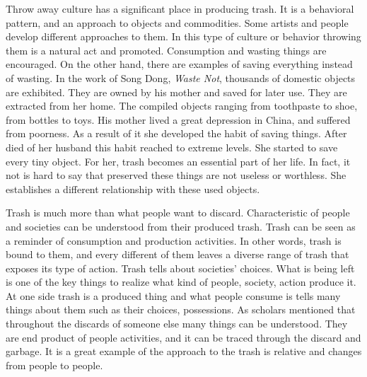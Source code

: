 Throw away culture has a significant place in producing trash. It is a behavioral pattern, and an approach to objects and commodities. Some artists and people develop different approaches to them. In this type of culture or behavior throwing them is a natural act and promoted. Consumption and wasting things are encouraged. On the other hand, there are examples of saving everything instead of wasting. In the work of Song Dong, \textit{Waste Not}, thousands of domestic objects are exhibited. They are owned by his mother and saved for later use. They are extracted from her home. The compiled objects ranging from toothpaste to shoe, from bottles to toys. His mother lived a great depression in China, and suffered from poorness. As a result of it she developed the habit of saving things. After died of her husband this habit reached to extreme levels. She started to save every tiny object. For her, trash becomes an essential part of her life. In fact, it not is hard to say that preserved these things are not useless or worthless. She establishes a different relationship with these used objects.

Trash is much more than what people want to discard. Characteristic of people and societies can be understood from their produced trash. Trash can be seen as a reminder of consumption and production activities. In other words, trash is bound to them, and every different of them leaves a diverse range of trash that exposes its type of action. Trash tells about societies’ choices. What is being left is one of the key things to realize what kind of people, society, action produce it. At one side trash is a produced thing and what people consume is tells many things about them such as their choices, possessions. As scholars mentioned that throughout the discards of someone else many things can be understood. They are end product of people activities, and it can be traced through the discard and garbage. It is a great example of the approach to the trash is relative and changes from people to people.


